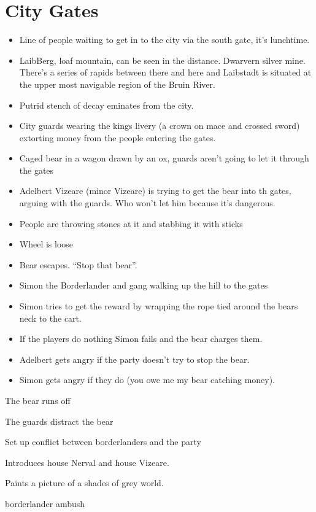 \documentclass[a4paper]{dnd5}
\begin{document}
\section*{City Gates}

\begin{itemize}
\item Line of people waiting to get in to the city via the south gate, it's lunchtime.
\item LaibBerg, loaf mountain, can be seen in the distance.  Dwarvern silver mine.  There's 
      a series of rapids between there and here and Laibstadt is situated at the upper most navigable region of the Bruin River.
\item Putrid stench of decay eminates from the city.
\item City guards wearing the kings livery (a crown on mace and crossed sword) extorting 
      money from the people entering the gates. 
\item Caged bear in a wagon drawn by an ox, guards aren't going to let it through the gates
\item Adelbert Vizeare (minor Vizeare) is trying to get the bear into th gates, arguing with the guards. Who won't let him because it's dangerous.
\item People are throwing stones at it and stabbing it with sticks
\item Wheel is loose
\item Bear escapes. ``Stop that bear''.  
\item Simon the Borderlander and gang walking up the hill to the gates
\item Simon tries to get the reward by wrapping the rope tied around the bears neck to the cart.
\item If the players do nothing Simon fails and the bear charges them.
\item Adelbert gets angry if the party doesn't try to stop the bear.
\item Simon gets angry if they do (you owe me my bear catching money).
\end{itemize}

\begin{outs} 
\item The bear runs off
\item The guards distract the bear 
\end{outs}

\begin{purpose}
\item Set up conflict between borderlanders and the party
\item Introduces house Nerval and house Vizeare.
\item Paints a picture of a shades of grey world.
\item borderlander ambush
\end{purpose}
     
\end{document}
